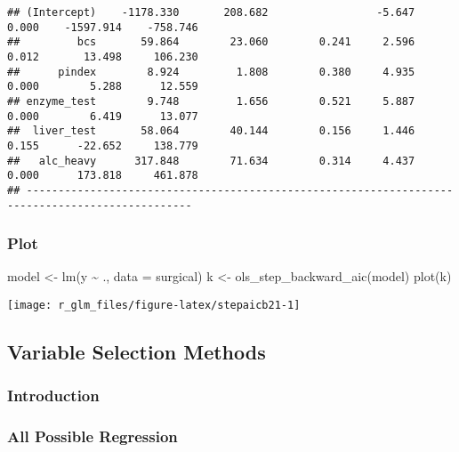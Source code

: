 \documentclass[
]{article}
\newenvironment{Shaded}{\begin{snugshade}}{\end{snugshade}}
\newcommand{\AttributeTok}[1]{\textcolor[rgb]{0.77,0.63,0.00}{#1}}
\newcommand{\FunctionTok}[1]{\textcolor[rgb]{0.00,0.00,0.00}{#1}}
\newcommand{\NormalTok}[1]{#1}
\newcommand{\OtherTok}[1]{\textcolor[rgb]{0.56,0.35,0.01}{#1}}
\newcommand{\SpecialCharTok}[1]{\textcolor[rgb]{0.00,0.00,0.00}{#1}}
\begin{document}
\begin{verbatim}
## (Intercept)    -1178.330       208.682                 -5.647    0.000    -1597.914    -758.746 
##         bcs       59.864        23.060        0.241     2.596    0.012       13.498     106.230 
##      pindex        8.924         1.808        0.380     4.935    0.000        5.288      12.559 
## enzyme_test        9.748         1.656        0.521     5.887    0.000        6.419      13.077 
##  liver_test       58.064        40.144        0.156     1.446    0.155      -22.652     138.779 
##   alc_heavy      317.848        71.634        0.314     4.437    0.000      173.818     461.878 
## ------------------------------------------------------------------------------------------------
\end{verbatim}

\hypertarget{plot-1}{%
\subsubsection{Plot}\label{plot-1}}

\begin{Shaded}
\begin{Highlighting}[]
\NormalTok{model }\OtherTok{\textless{}{-}} \FunctionTok{lm}\NormalTok{(y }\SpecialCharTok{\textasciitilde{}}\NormalTok{ ., }\AttributeTok{data =}\NormalTok{ surgical)}
\NormalTok{k }\OtherTok{\textless{}{-}} \FunctionTok{ols\_step\_backward\_aic}\NormalTok{(model)}
\FunctionTok{plot}\NormalTok{(k)}
\end{Highlighting}
\end{Shaded}

\begin{center}\texttt{[image: r\_glm\_files/figure-latex/stepaicb21-1]} \end{center}

\hypertarget{variable-selection-methods}{%
\subsection{Variable Selection
Methods}\label{variable-selection-methods}}

\hypertarget{introduction}{%
\subsubsection{Introduction}\label{introduction}}

\hypertarget{all-possible-regression}{%
\subsubsection{All Possible Regression}\label{all-possible-regression}}
\end{document}
